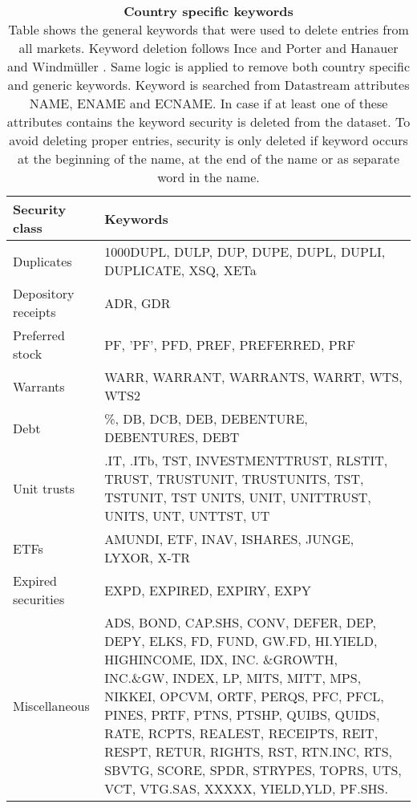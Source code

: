 \documentclass{article}
\begin{document}
\begin{table}[h] 
\small
\caption[Country specific keywords]{\textbf{Country specific keywords}\\ Table shows the general keywords that were used to delete entries from all markets. Keyword deletion follows Ince and Porter \protect\citeyear{Ince2006} and Hanauer and Windmüller \protect\citeyear{HANAUER2023106712}. Same logic is applied to remove both country specific and generic keywords. Keyword is searched from Datastream attributes NAME, ENAME and ECNAME. In case if at least one of these attributes contains the keyword security is deleted from the dataset. To avoid deleting proper entries, security is only deleted if keyword occurs at the beginning of the name, at the end of the name or as separate word in the name.}
 \label{table:generalKeywords}
\centering
\begin{tabularx}{\textwidth}{l X}
\toprule
Security class 	& Keywords \\
\midrule
Duplicates 		& 1000DUPL, DULP, DUP, DUPE, DUPL, DUPLI, DUPLICATE, XSQ, XETa  \\[1ex]
Depository receipts	& ADR, GDR \\[1ex]
Preferred stock 	&  PF, ’PF’, PFD, PREF, PREFERRED, PRF\\ [1ex]
Warrants 			&  WARR, WARRANT, WARRANTS, WARRT, WTS, WTS2\\[1ex]
Debt 			& \%, DB, DCB, DEB, DEBENTURE, DEBENTURES, DEBT\\[1ex]
Unit trusts 		& .IT, .ITb, TST, INVESTMENTTRUST, RLSTIT, TRUST, TRUSTUNIT, TRUSTUNITS, TST, TSTUNIT, TST UNITS, UNIT, UNITTRUST, UNITS, UNT, UNTTST, UT\\[1ex]
ETFs 			& AMUNDI, ETF, INAV, ISHARES, JUNGE, LYXOR, X-TR\\[1ex]
Expired securities 	& EXPD, EXPIRED, EXPIRY, EXPY\\[1ex]
Miscellaneous 		& ADS, BOND, CAP.SHS, CONV, DEFER, DEP, DEPY, ELKS, FD, FUND, GW.FD, HI.YIELD, HIGHINCOME, IDX, INC.								\&GROWTH, INC.\&GW, INDEX, LP, MITS, MITT, MPS, NIKKEI, OPCVM, ORTF, PERQS, 												PFC, PFCL, PINES, PRTF, PTNS, PTSHP, QUIBS, QUIDS, RATE, RCPTS, REALEST, RECEIPTS, REIT, RESPT, 								RETUR, RIGHTS, RST, RTN.INC, RTS, SBVTG, SCORE, SPDR, STRYPES, TOPRS, UTS, VCT, VTG.SAS, 									XXXXX, YIELD,YLD, PF.SHS.\\
 \bottomrule
 \end{tabularx}
 \end{table} 
\end{document}
